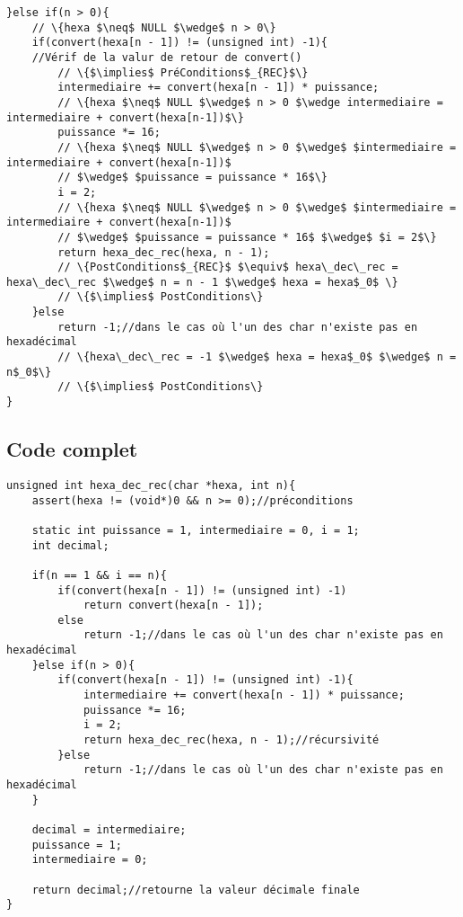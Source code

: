 \documentclass[a4paper, 11pt, oneside]{article}
\begin{document}
\begin{lstlisting}
}else if(n > 0){
    // \{hexa $\neq$ NULL $\wedge$ n > 0\}
    if(convert(hexa[n - 1]) != (unsigned int) -1){
    //Vérif de la valur de retour de convert()
        // \{$\implies$ PréConditions$_{REC}$\}
        intermediaire += convert(hexa[n - 1]) * puissance;
        // \{hexa $\neq$ NULL $\wedge$ n > 0 $\wedge intermediaire = intermediaire + convert(hexa[n-1])$\}
        puissance *= 16;
        // \{hexa $\neq$ NULL $\wedge$ n > 0 $\wedge$ $intermediaire = intermediaire + convert(hexa[n-1])$
        // $\wedge$ $puissance = puissance * 16$\}
        i = 2;
        // \{hexa $\neq$ NULL $\wedge$ n > 0 $\wedge$ $intermediaire = intermediaire + convert(hexa[n-1])$
        // $\wedge$ $puissance = puissance * 16$ $\wedge$ $i = 2$\}
        return hexa_dec_rec(hexa, n - 1);
        // \{PostConditions$_{REC}$ $\equiv$ hexa\_dec\_rec = hexa\_dec\_rec $\wedge$ n = n - 1 $\wedge$ hexa = hexa$_0$ \}
        // \{$\implies$ PostConditions\}
    }else
        return -1;//dans le cas où l'un des char n'existe pas en hexadécimal
        // \{hexa\_dec\_rec = -1 $\wedge$ hexa = hexa$_0$ $\wedge$ n = n$_0$\}
        // \{$\implies$ PostConditions\}
}
\end{lstlisting}

\newpage

\subsection{Code complet}

\begin{lstlisting}
unsigned int hexa_dec_rec(char *hexa, int n){
    assert(hexa != (void*)0 && n >= 0);//préconditions
    
    static int puissance = 1, intermediaire = 0, i = 1;
    int decimal;
    
    if(n == 1 && i == n){
        if(convert(hexa[n - 1]) != (unsigned int) -1)
            return convert(hexa[n - 1]);
        else
            return -1;//dans le cas où l'un des char n'existe pas en hexadécimal
    }else if(n > 0){
        if(convert(hexa[n - 1]) != (unsigned int) -1){
            intermediaire += convert(hexa[n - 1]) * puissance;
            puissance *= 16;
            i = 2;
            return hexa_dec_rec(hexa, n - 1);//récursivité
        }else
            return -1;//dans le cas où l'un des char n'existe pas en hexadécimal
    }
    
    decimal = intermediaire;
    puissance = 1;
    intermediaire = 0;
    
    return decimal;//retourne la valeur décimale finale
}
\end{lstlisting}
\end{document}
